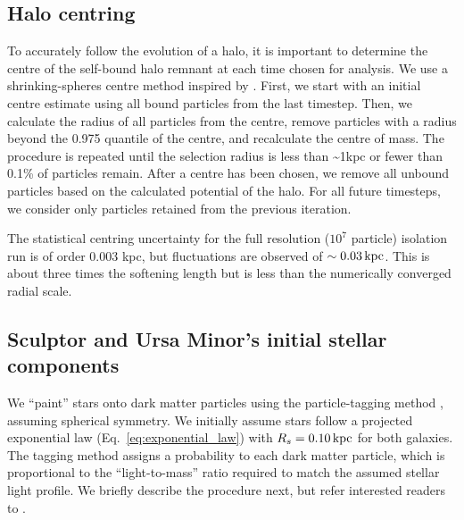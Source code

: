 \subsection{Halo centring}\label{sec:shrinking_spheres}

To accurately follow the evolution of a halo, it is important to
determine the centre of the self-bound halo remnant at each time chosen
for analysis. We use a shrinking-spheres centre method inspired by
\citet{power+2003}. First, we start with an initial centre estimate
using all bound particles from the last timestep. Then, we calculate the
radius of all particles from the centre, remove particles with a radius
beyond the 0.975 quantile of the centre, and recalculate the centre of
mass. The procedure is repeated until the selection radius is less than
\textasciitilde1kpc or fewer than 0.1\% of particles remain. After a
centre has been chosen, we remove all unbound particles based on the
\gadget{} calculated potential of the halo. For all future timesteps, we
consider only particles retained from the previous iteration.

The statistical centring uncertainty for the full resolution (\(10^7\)
particle) isolation run is of order 0.003 kpc, but fluctuations are
observed of \(\sim 0.03\,{\rm kpc}\). This is about three times the softening
length but is less than the numerically converged radial scale.

\subsection{Sculptor and Ursa Minor's initial stellar
components}\label{sec:painting_stars}

We ``paint'' stars onto dark matter particles using the particle-tagging
method \citep[e.g.,][]{bullock+johnston2005}, assuming spherical
symmetry. We initially assume stars follow a projected exponential law
(Eq.~\ref{eq:exponential_law}) with \(R_s = 0.10\,{\rm kpc}\) for both
galaxies. The tagging method assigns a probability to each dark matter
particle, which is proportional to the ``light-to-mass'' ratio required
to match the assumed stellar light profile. We briefly describe the
procedure next, but refer interested readers to \citet{EP2020}.

